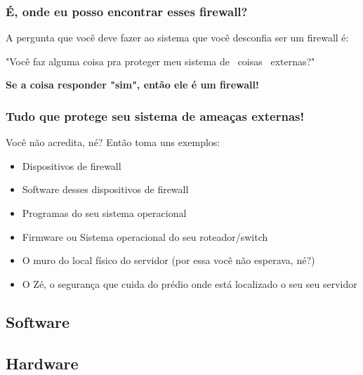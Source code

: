\begin{frame}

	\frametitle{É, onde eu posso encontrar esses firewall?}

	\begin{block}{A pergunta que você deve fazer ao sistema que você desconfia ser um firewall é:}

	"Você faz alguma coisa pra proteger meu sistema de ~coisas~ externas?"

	\end{block}


	\textbf{Se a coisa responder "sim", então ele é um firewall!}

\end{frame}

\begin{frame}

	\frametitle{Tudo que protege seu sistema de ameaças externas!}
	
	Você não acredita, né? Então toma uns exemplos:

	\begin{itemize}
		\item{Dispositivos de firewall}
		\item{Software desses dispositivos de firewall}
		\item{Programas do seu sistema operacional}
		\item{Firmware ou Sistema operacional do seu roteador/switch}
		\item{O muro do local físico do servidor (por essa você não esperava, né?)}
		\item{O Zé, o segurança que cuida do prédio onde está localizado o seu seu servidor}
	\end{itemize}

\end{frame}

\subsection{Software}





\subsection{Hardware}

